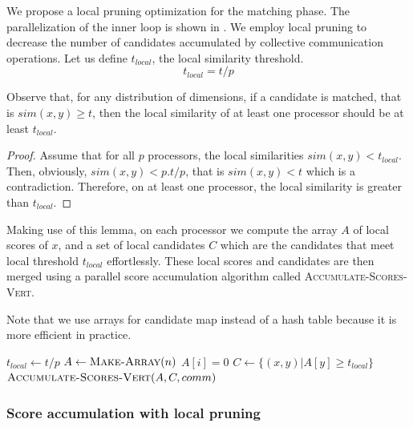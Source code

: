 \documentclass{comjnl}
\newcommand{\algo}[1]{\textsc{#1}} %
\begin{document}
We propose a local pruning optimization for the matching phase.
The parallelization of the inner loop is shown in
. We employ local pruning to
decrease the number of candidates accumulated by collective
communication operations. Let us define $t_{local}$, the local
similarity threshold.
\begin{equation}
  \label{eq:1}
  t_{local} = t/p
\end{equation}
\begin{lemma}
  \label{lem:localpruning}
  Observe that, for any distribution of dimensions, if a candidate is
  matched, that is $sim(x,y) \geq t$, then the local similarity of at
  least one processor should be at least $t_{local}$.
\end{lemma}
\begin{proof}
  Assume that for all $p$ processors, the local similarities $sim(x,y)
  < t_{local}$. Then, obviously, $sim(x,y) < p . t / p$, that is
  $sim(x,y) < t$ which is a contradiction. Therefore, on at least one
  processor, the local similarity is greater than $t_{local}$.
\end{proof}

Making use of this lemma, on each processor we compute the array $A$
of local scores of $x$, and a set of local candidates $C$ which are
the candidates that meet local threshold $t_{local}$
effortlessly. These local scores and candidates are then merged using
a parallel score accumulation algorithm called
\algo{Accumulate-Scores-Vert}.

Note that we use arrays for candidate map instead of a hash table
because it is more efficient in practice.

\begin{algorithm}[top]
  \caption{$\algo{Par-Find-Matches-0-Vert}(x,I, t, comm)$}
  \label{alg:par-find-matches-0-vert}
  \begin{algorithmic}
    \STATE $t_{local} \gets t/p$ \STATE $A \gets \algo{Make-Array}(n)$
     $A[i] = 0$   
    \ENDFOR
    \STATE $C \gets \{ (x, y) | A[y] \geq t_{local} \}$ \RETURN
    $\algo{Accumulate-Scores-Vert}(A, C, comm)$
    \ENDFOR
  \end{algorithmic}
\end{algorithm}

\subsubsection{Score accumulation with local pruning}
\end{document}
